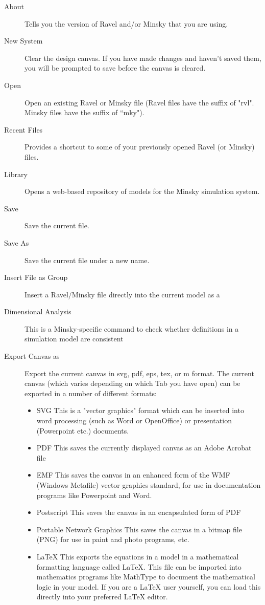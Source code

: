 \begin{description}
\item[About] Tells you the version of Ravel and/or Minsky that you are using.

\item[New System] Clear the design canvas. If you have made changes and haven't saved them, you will be prompted to save before the canvas is cleared.

\item[Open] Open an existing Ravel or Minsky file (Ravel files have the suffix of "rvl". Minsky files have the suffix of ``mky").

\item[Recent Files]\label{recentfiles} Provides a shortcut to some of your previously opened Ravel (or Minsky) files.

\item[Library] Opens a web-based repository of models for the Minsky simulation system. 

\item[Save] Save the current file.

\item[Save As] Save the current file under a new name.

\item[Insert File as Group] Insert a Ravel/Minsky file directly into the current model as a 

\item[Dimensional Analysis] This is a Minsky-specific command to check whether definitions in a simulation model are consistent

\item[Export Canvas as] Export the current canvas in svg, pdf, eps, tex, or m format. The current canvas (which varies depending on which Tab you have open) can be exported in a number of different formats:

\begin{itemize}
\item SVG
This is a "vector graphics" format which can be inserted into word processing (such as Word or OpenOffice) or presentation (Powerpoint etc.) documents.
\item PDF
This saves the currently displayed canvas as an Adobe Acrobat file
\item EMF
This saves the canvas in an enhanced form of the WMF (Windows Metafile) vector graphics standard, for use in documentation programs like Powerpoint and Word.
\item Postscript
This saves the canvas in an encapsulated form of PDF 
\item Portable Network Graphics
This saves the canvas in a bitmap file (PNG) for use in paint and photo programs, etc.
\item LaTeX
This exports the equations in a model in a mathematical formatting language called LaTeX. This file can be imported into mathematics programs like MathType to document the mathematical logic in your model. If you are a LaTeX user yourself, you can load this directly into your preferred LaTeX editor.



\end{itemize}
\end{description}
